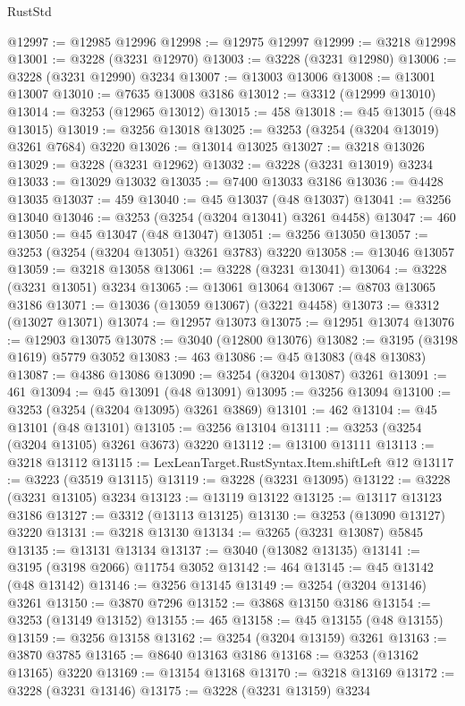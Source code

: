 \begin{lexlean}{RustStd}
\begin{coremodule}
@12997 := @12985 @12996
@12998 := @12975 @12997
@12999 := @3218 @12998
@13001 := @3228 (@3231 @12970)
@13003 := @3228 (@3231 @12980)
@13006 := @3228 (@3231 @12990) @3234
@13007 := @13003 @13006
@13008 := @13001 @13007
@13010 := @7635 @13008 @3186
@13012 := @3312 (@12999 @13010)
@13014 := @3253 (@12965 @13012)
@13015 := 458
@13018 := @45 @13015 (@48 @13015)
@13019 := @3256 @13018
@13025 := @3253 (@3254 (@3204 @13019) @3261 @7684) @3220
@13026 := @13014 @13025
@13027 := @3218 @13026
@13029 := @3228 (@3231 @12962)
@13032 := @3228 (@3231 @13019) @3234
@13033 := @13029 @13032
@13035 := @7400 @13033 @3186
@13036 := @4428 @13035
@13037 := 459
@13040 := @45 @13037 (@48 @13037)
@13041 := @3256 @13040
@13046 := @3253 (@3254 (@3204 @13041) @3261 @4458)
@13047 := 460
@13050 := @45 @13047 (@48 @13047)
@13051 := @3256 @13050
@13057 := @3253 (@3254 (@3204 @13051) @3261 @3783) @3220
@13058 := @13046 @13057
@13059 := @3218 @13058
@13061 := @3228 (@3231 @13041)
@13064 := @3228 (@3231 @13051) @3234
@13065 := @13061 @13064
@13067 := @8703 @13065 @3186
@13071 := @13036 (@13059 @13067) (@3221 @4458)
@13073 := @3312 (@13027 @13071)
@13074 := @12957 @13073
@13075 := @12951 @13074
@13076 := @12903 @13075
@13078 := @3040 (@12800 @13076)
@13082 := @3195 (@3198 @1619) @5779 @3052
@13083 := 463
@13086 := @45 @13083 (@48 @13083)
@13087 := @4386 @13086
@13090 := @3254 (@3204 @13087) @3261
@13091 := 461
@13094 := @45 @13091 (@48 @13091)
@13095 := @3256 @13094
@13100 := @3253 (@3254 (@3204 @13095) @3261 @3869)
@13101 := 462
@13104 := @45 @13101 (@48 @13101)
@13105 := @3256 @13104
@13111 := @3253 (@3254 (@3204 @13105) @3261 @3673) @3220
@13112 := @13100 @13111
@13113 := @3218 @13112
@13115 := LexLeanTarget.RustSyntax.Item.shiftLeft @12
@13117 := @3223 (@3519 @13115)
@13119 := @3228 (@3231 @13095)
@13122 := @3228 (@3231 @13105) @3234
@13123 := @13119 @13122
@13125 := @13117 @13123 @3186
@13127 := @3312 (@13113 @13125)
@13130 := @3253 (@13090 @13127) @3220
@13131 := @3218 @13130
@13134 := @3265 (@3231 @13087) @5845
@13135 := @13131 @13134
@13137 := @3040 (@13082 @13135)
@13141 := @3195 (@3198 @2066) @11754 @3052
@13142 := 464
@13145 := @45 @13142 (@48 @13142)
@13146 := @3256 @13145
@13149 := @3254 (@3204 @13146) @3261
@13150 := @3870 @7296
@13152 := @3868 @13150 @3186
@13154 := @3253 (@13149 @13152)
@13155 := 465
@13158 := @45 @13155 (@48 @13155)
@13159 := @3256 @13158
@13162 := @3254 (@3204 @13159) @3261
@13163 := @3870 @3785
@13165 := @8640 @13163 @3186
@13168 := @3253 (@13162 @13165) @3220
@13169 := @13154 @13168
@13170 := @3218 @13169
@13172 := @3228 (@3231 @13146)
@13175 := @3228 (@3231 @13159) @3234

\end{coremodule}
\end{lexlean}

